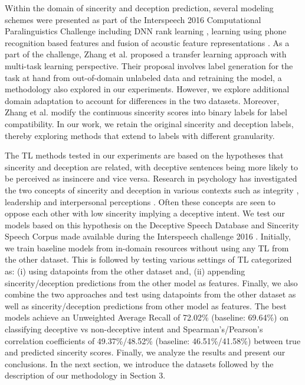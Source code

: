 \documentclass{article}
\begin{document}
\begin{spacing}{0.89}
Within the domain of sincerity and deception prediction, several modeling schemes were presented as part of the Interspeech 2016 Computational Paralinguistics Challenge \cite{schuller2016interspeech} including DNN rank learning \cite{gabor2016sinc}, learning using phone recognition based features \cite{herms2016sinc} and fusion of acoustic feature representations \cite{kaya2016sinc}.  
As a part of the challenge, Zhang et al. \cite{zhang2016sinc} proposed a transfer learning approach with multi-task learning perspective.
Their proposal involves label generation for the task at hand from out-of-domain unlabeled data and retraining the model, a methodology also explored in our experiments.
However, we explore additional domain adaptation to account for differences in the two datasets. 
Moreover, Zhang et al. \cite{zhang2016sinc} modify the continuous sincerity scores into binary labels for label compatibility.
In our work, we retain the original sincerity and deception labels, thereby exploring methods that extend to labels with different granularity. 

The TL methods tested in our experiments are based on the hypotheses that sincerity and deception are related, with deceptive sentences being more likely to be perceived as insincere and vice versa. 
Research in psychology has investigated the two concepts of sincerity and deception in various contexts such as integrity \cite{mcfall1987integrity}, leadership \cite{stinchfield1936sincerity} and interpersonal perceptions \cite{toris1984effects}. 
Often these concepts are seen to oppose each other with low sincerity implying a deceptive intent. 
We test our models based on this hypothesis on the Deceptive Speech Database and Sincerity Speech Corpus made available during the Interspeech challenge 2016 \cite{schuller2016interspeech}.
Initially, we train baseline models from in-domain resources without using any TL from the other dataset. 
This is followed by testing various settings of TL categorized as: (i) using datapoints from the other dataset and, (ii) appending sincerity/deception predictions from the other model as features.
Finally, we also combine the two approaches and test using datapoints from the other dataset as well as sincerity/deception predictions from other model as features.
The best models achieve an Unweighted Average Recall of 72.02\% (baseline: 69.64\%) on classifying deceptive vs non-deceptive intent and Spearman's/Pearson's correlation coefficients of 49.37\%/48.52\% (baseline: 46.51\%/41.58\%) between true and predicted sincerity scores.
Finally, we analyze the results and present our conclusions. 
In the next section, we introduce the datasets followed by the description of our methodology in Section 3.


\end{spacing}
\end{document}
